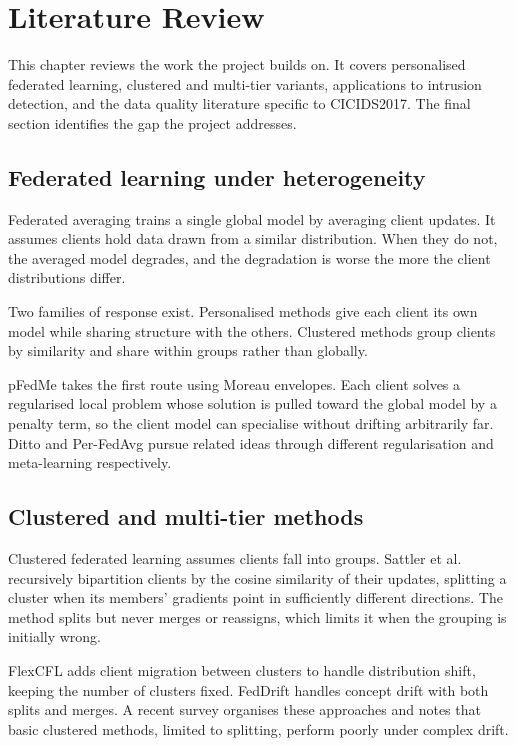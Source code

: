 \chapter{Literature Review}
\label{chap:litreview}

This chapter reviews the work the project builds on. It covers personalised
federated learning, clustered and multi-tier variants, applications to
intrusion detection, and the data quality literature specific to CICIDS2017.
The final section identifies the gap the project addresses.

\section{Federated learning under heterogeneity}
\label{sec:fl-hetero}

Federated averaging \parencite{mcmahan-2017} trains a single global model by
averaging client updates. It assumes clients hold data drawn from a similar
distribution. When they do not, the averaged model degrades, and the degradation
is worse the more the client distributions differ.

Two families of response exist. Personalised methods give each client its own
model while sharing structure with the others. Clustered methods group clients
by similarity and share within groups rather than globally.

pFedMe \parencite{dinh-2020} takes the first route using Moreau envelopes. Each
client solves a regularised local problem whose solution is pulled toward the
global model by a penalty term, so the client model can specialise without
drifting arbitrarily far. Ditto \parencite{li-2021} and Per-FedAvg
\parencite{fallah-2020} pursue related ideas through different regularisation
and meta-learning respectively.

\section{Clustered and multi-tier methods}
\label{sec:clustered}

Clustered federated learning assumes clients fall into groups. Sattler et al.
\parencite{sattler-2020} recursively bipartition clients by the cosine
similarity of their updates, splitting a cluster when its members' gradients
point in sufficiently different directions. The method splits but never merges
or reassigns, which limits it when the grouping is initially wrong.

FlexCFL \parencite{duan-2021} adds client migration between clusters to handle
distribution shift, keeping the number of clusters fixed. FedDrift
\parencite{jothimurugesan-2023} handles concept drift with both splits and
merges. A recent survey \parencite{cfl-survey-2025} organises these approaches
and notes that basic clustered methods, limited to splitting, perform poorly
under complex drift.

